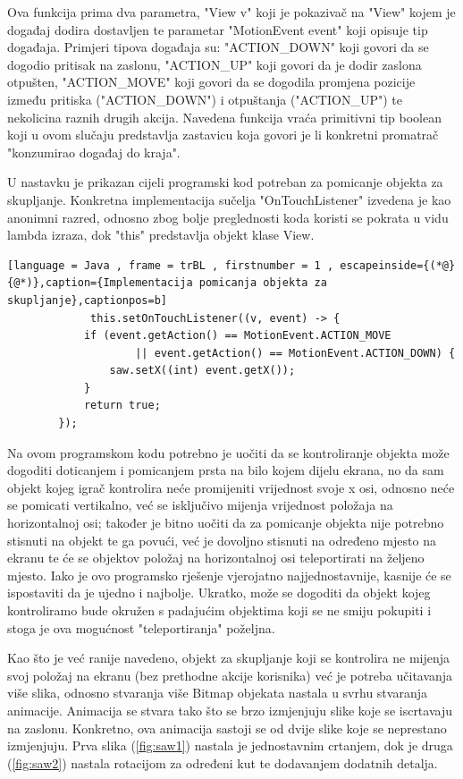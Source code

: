 \documentclass[times, utf8, zavrsni, numeric]{fer}
\begin{document}
	Ova funkcija prima dva parametra, "View v" koji je pokazivač na "View" kojem je događaj dodira dostavljen te parametar "MotionEvent event" koji opisuje tip događaja. Primjeri tipova događaja su: 
	"ACTION\_DOWN" koji govori da se dogodio pritisak na zaslonu, "ACTION\_UP" koji govori da je dodir zaslona otpušten, "ACTION\_MOVE" koji govori da se dogodila promjena pozicije između pritiska ("ACTION\_DOWN") i otpuštanja
	("ACTION\_UP") te nekolicina raznih drugih akcija. Navedena funkcija vraća primitivni tip boolean koji u ovom slučaju predstavlja zastavicu koja govori je li konkretni promatrač "konzumirao događaj do kraja".
	
	U nastavku je prikazan cijeli programski kod potreban za pomicanje objekta za skupljanje. Konkretna implementacija sučelja "OnTouchListener" izvedena je kao anonimni razred, odnosno zbog bolje preglednosti koda 
	koristi se pokrata u vidu lambda izraza, dok "this" predstavlja objekt klase View.
		 \renewcommand{\lstlistingname}{Kôd}
		\begin{lstlisting}[language = Java , frame = trBL , firstnumber = 1 , escapeinside={(*@}{@*)},caption={Implementacija pomicanja objekta za skupljanje},captionpos=b]
			 this.setOnTouchListener((v, event) -> {
            if (event.getAction() == MotionEvent.ACTION_MOVE 
					|| event.getAction() == MotionEvent.ACTION_DOWN) {
                saw.setX((int) event.getX());
            }
            return true;
        });
		\end{lstlisting}


		
	Na ovom programskom kodu potrebno je uočiti da se kontroliranje objekta može dogoditi doticanjem i pomicanjem prsta na bilo kojem dijelu ekrana, no da sam objekt kojeg igrač kontrolira neće promijeniti 
	vrijednost svoje x osi, odnosno neće se pomicati vertikalno, već se isključivo mijenja vrijednost položaja na horizontalnoj osi; također je bitno uočiti da za pomicanje objekta nije potrebno stisnuti na objekt
	te ga povući, već je dovoljno stisnuti na određeno mjesto na ekranu te će se objektov položaj na horizontalnoj  osi teleportirati na željeno mjesto. Iako je ovo programsko rješenje vjerojatno najjednostavnije, 
	kasnije će se ispostaviti da je ujedno i najbolje. Ukratko, može se dogoditi da objekt kojeg kontroliramo bude okružen s padajućim objektima koji se ne smiju pokupiti i stoga je ova mogućnost "teleportiranja" poželjna.
	
	
	Kao što je već ranije navedeno, objekt za skupljanje koji se kontrolira ne mijenja svoj položaj na ekranu (bez prethodne akcije korisnika) već je potreba učitavanja više slika, odnosno stvaranja više Bitmap 
	objekata nastala u svrhu stvaranja animacije. Animacija se stvara tako što se brzo izmjenjuju slike koje se iscrtavaju na zaslonu. Konkretno, ova animacija sastoji se od dvije slike koje se neprestano izmjenjuju.
	Prva slika (\ref{fig:saw1}) nastala je jednostavnim crtanjem, dok je druga (\ref{fig:saw2}) nastala rotacijom za određeni kut te dodavanjem dodatnih detalja. 
	
\end{document}
